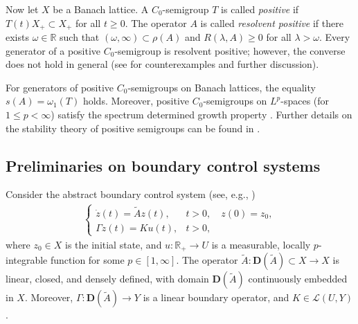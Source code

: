 \documentclass[onecolumn]{autart}
\def\R{{\mathbb{R}}}
\def\R{\mathbb R}
\numberwithin{equation}{section}
\begin{document}
    Now let $X$ be a Banach lattice. A $C_0$-semigroup $T$ is called \emph{positive} if $T(t)X_+ \subset X_+$ for all $t \ge 0$. The operator $A$ is called \emph{resolvent positive} if there exists $\omega \in \mathbb{R}$ such that $(\omega,\infty) \subset \rho(A)$ and $R(\lambda,A) \ge 0$ for all $\lambda > \omega$. Every generator of a positive $C_0$-semigroup is resolvent positive; however, the converse does not hold in general (see \cite{Arendt} for counterexamples and further discussion).

    For generators of positive $C_0$-semigroups on Banach lattices, the equality $s(A) = \omega_1(T)$ holds. Moreover, positive $C_0$-semigroups on $L^p$-spaces (for $1 \le p < \infty$) satisfy the spectrum determined growth property \cite{Lutz1}. Further details on the stability theory of positive semigroups can be found in \cite[Sect.~C.IV.1]{Nagel}.

	
	\subsection{Preliminaries on boundary control systems}\label{Sec:2.2}
	Consider the abstract boundary control system (see, e.g., \cite{Fattorini})
	\begin{align}\label{BC}
		\begin{cases}
			\dot{z}(t)= \tilde{A} z(t),& t>0, \quad z(0)={z_0},\\
			\Gamma z(t)=K u(t),& t>0,
		\end{cases}
	\end{align}
	where $z_0 \in X$ is the initial state, and $u \colon \R_+ \to U$ is a measurable, locally $p$-integrable function for some $p \in [1,\infty]$. The operator $\tilde{A} \colon \bm{D}(\tilde{A}) \subset X \to X$ is linear, closed, and densely defined, with domain $\bm{D}(\tilde{A})$ continuously embedded in $X$. Moreover, $\Gamma \colon \bm{D}(\tilde{A}) \to Y$ is a linear boundary operator, and $K \in \mathcal{L}(U,Y)$.
	
\end{document}
